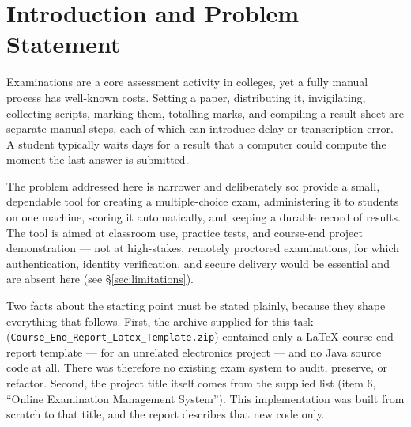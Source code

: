 \documentclass[11pt,a4paper]{article}
\begin{document}
\section{Introduction and Problem Statement}
Examinations are a core assessment activity in colleges, yet a fully manual process
has well-known costs. Setting a paper, distributing it, invigilating, collecting
scripts, marking them, totalling marks, and compiling a result sheet are separate
manual steps, each of which can introduce delay or transcription error. A student
typically waits days for a result that a computer could compute the moment the last
answer is submitted.

The problem addressed here is narrower and deliberately so: provide a small,
dependable tool for creating a multiple-choice exam, administering it to students
on one machine, scoring it automatically, and keeping a durable record of results.
The tool is aimed at classroom use, practice tests, and course-end project
demonstration --- not at high-stakes, remotely proctored examinations, for which
authentication, identity verification, and secure delivery would be essential and
are absent here (see \S\ref{sec:limitations}).

Two facts about the starting point must be stated plainly, because they shape
everything that follows. First, the archive supplied for this task
(\texttt{Course\_End\_Report\_Latex\_Template.zip}) contained only a LaTeX course-end
report template --- for an unrelated electronics project --- and no Java source
code at all. There was therefore no existing exam system to audit, preserve, or
refactor. Second, the project title itself comes from the supplied list (item 6,
``Online Examination Management System''). This implementation was built from
scratch to that title, and the report describes that new code only.
\end{document}
